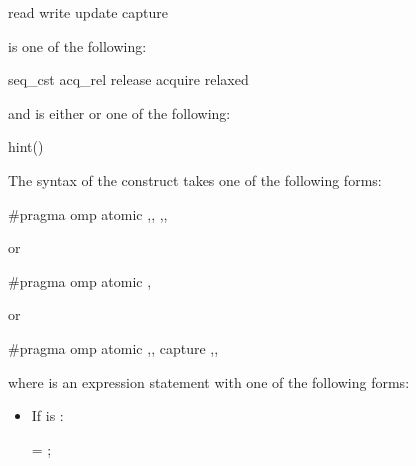 \begin{indentedcodelist}
read
write
update
capture
\end{indentedcodelist}

 is one of the following:

\begin{indentedcodelist}
seq_cst
acq_rel
release
acquire
relaxed
\end{indentedcodelist}

and  is either  or one of the following:

\begin{indentedcodelist}
hint()
\end{indentedcodelist}

\begin{ccppspecific}
The syntax of the  construct takes one of the following forms:

\begin{ompcPragma}
#pragma omp atomic \plc{[clause[[[},\plc{] clause] ... ] [},\plc{]]} 
                   \plc{[[},\plc{] clause [[[},\plc{] clause] ... ]]} 
\end{ompcPragma}


or

\begin{ompcPragma}
#pragma omp atomic \plc{[clause[[},\plc{] clause] ... ]} 
\end{ompcPragma}

or

\begin{ompcPragma}
#pragma omp atomic \plc{[clause[[[},\plc{] clause] ... ] [},\plc{]]} capture
                   \plc{[[},\plc{] clause [[[},\plc{] clause] ... ]]} 
\end{ompcPragma}

where  is an expression statement with one of the following forms:

\begin{itemize}
\item If  is :
\begin{ompSyntax}
 = ;
\end{ompSyntax}



\end{itemize}
\end{ccppspecific}
